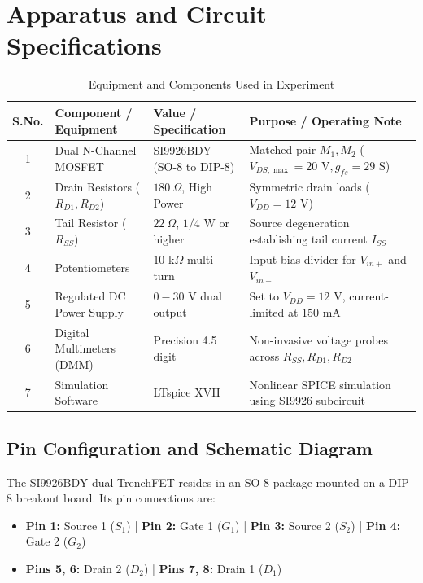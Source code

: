 \documentclass[11pt,a4paper]{article}
\begin{document}
\section{Apparatus and Circuit Specifications}
\begin{table}[H]
\centering
\caption{Equipment and Components Used in Experiment}
\begin{tabular}{@{}cllp{6.5cm}@{}}
\toprule
\textbf{S.No.} & \textbf{Component / Equipment} & \textbf{Value / Specification} & \textbf{Purpose / Operating Note} \\ \midrule
1 & Dual N-Channel MOSFET & SI9926BDY (SO-8 to DIP-8) & Matched pair $M_1, M_2$ ($V_{DS,\max}=20\text{ V}, g_{fs}=29\text{ S}$) \\
2 & Drain Resistors ($R_{D1}, R_{D2}$) & $180\ \Omega$, High Power & Symmetric drain loads ($V_{DD} = 12\text{ V}$) \\
3 & Tail Resistor ($R_{SS}$) & $22\ \Omega$, $1/4\text{ W}$ or higher & Source degeneration establishing tail current $I_{SS}$ \\
4 & Potentiometers & $10\text{ k}\Omega$ multi-turn & Input bias divider for $V_{in+}$ and $V_{in-}$ \\
5 & Regulated DC Power Supply & $0-30\text{ V}$ dual output & Set to $V_{DD} = 12\text{ V}$, current-limited at $150\text{ mA}$ \\
6 & Digital Multimeters (DMM) & Precision 4.5 digit & Non-invasive voltage probes across $R_{SS}, R_{D1}, R_{D2}$ \\
7 & Simulation Software & LTspice XVII & Nonlinear SPICE simulation using SI9926 subcircuit \\
\bottomrule
\end{tabular}
\end{table}

\subsection{Pin Configuration and Schematic Diagram}
The SI9926BDY dual TrenchFET resides in an SO-8 package mounted on a DIP-8 breakout board. Its pin connections are:
\begin{itemize}
    \item \textbf{Pin 1:} Source 1 ($S_1$) \quad | \quad \textbf{Pin 2:} Gate 1 ($G_1$) \quad | \quad \textbf{Pin 3:} Source 2 ($S_2$) \quad | \quad \textbf{Pin 4:} Gate 2 ($G_2$)
    \item \textbf{Pins 5, 6:} Drain 2 ($D_2$) \quad | \quad \textbf{Pins 7, 8:} Drain 1 ($D_1$)
\end{itemize}
\end{document}
